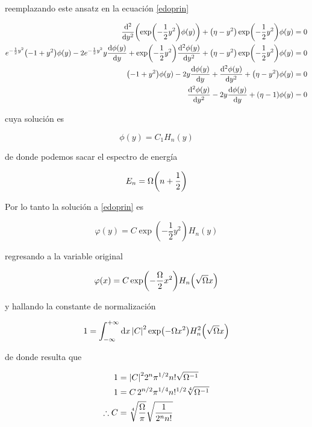 \documentclass[../Main.tex]{subfiles}
\begin{document}
reemplazando este ansatz en la ecuación \eqref{edoprin}

\begin{equation}
\begin{split}
\dv[2]{y}(\exp(-\dfrac{1}{2}y^2)\phi(y)) + \pqty{\eta-y^2}\exp(-\dfrac{1}{2}y^2)\phi(y) & = 0 \\
e^{-\frac{1}{2}y^2}\qty(- 1+ y^2)\phi(y)-2e^{-\frac{1}{2}y^2}y\dv{\phi(y)}{y}+\exp(-\dfrac{1}{2}y^2)\dv[2]{\phi(y)}{y} + \pqty{\eta-y^2}\exp(-\dfrac{1}{2}y^2)\phi(y) & = 0\\
\qty(- 1+ y^2)\phi(y)-2y\dv{\phi(y)}{y}+\dv[2]{\phi(y)}{y}+\pqty{\eta-y^2}\phi(y) & = 0 \\
\dv[2]{\phi(y)}{y}-2y\dv{\phi(y)}{y}+\pqty{\eta-1}\phi(y) & = 0
\end{split}
\end{equation}

cuya solución es 

\begin{equation}
\phi(y)=C_1H_n(y)
\end{equation}

de donde podemos sacar el espectro de energía

\begin{equation}
E_n=\Omega\pqty{n+\dfrac{1}{2}}
\end{equation}

Por lo tanto la solución a \eqref{edoprin} es 

\begin{equation}
\varphi(y)=C\exp(-\dfrac{1}{2}y^2)H_n(y)
\end{equation}

regresando a la variable original

\begin{equation}
\varphi(x)=C\exp(-\dfrac{\Omega}{2}x^2)H_n\qty(\sqrt{\Omega}x)
\end{equation}

y hallando la constante de normalización

\begin{equation}
1=\int_{-\infty}^{+\infty}\dd{x}\abs{C}^2\exp(-\Omega x^2)H^2_n\qty(\sqrt{\Omega}x)
\end{equation}

de donde resulta que

\begin{equation}
\begin{split}
1 & = \abs{C}^2 2^n\pi^{1/2}n!\sqrt{\Omega^{-1}} \\
1 & = C \, 2^{n/2}\pi^{1/4}n!^{1/2}\sqrt[4]{\Omega^{-1}} \\
\therefore C & = \sqrt[4]{\dfrac{\Omega}{\pi}}\sqrt{\dfrac{1}{2^nn!}}
\end{split}
\end{equation}
\end{document}
